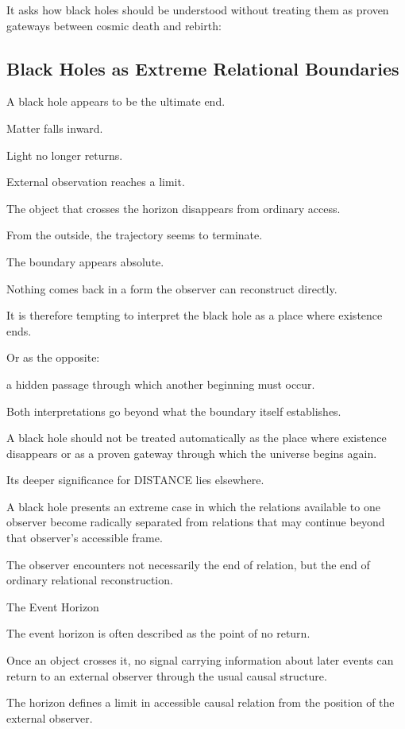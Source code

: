 It asks how black holes should be understood without treating them as proven gateways between cosmic death and rebirth:

\subsection*{\textbf{Black Holes as Extreme Relational Boundaries}} 

A black hole appears to be the ultimate end.

Matter falls inward.

Light no longer returns.

External observation reaches a limit.

The object that crosses the horizon disappears from ordinary access.

From the outside, the trajectory seems to terminate.

The boundary appears absolute.

Nothing comes back in a form the observer can reconstruct directly.

It is therefore tempting to interpret the black hole as a place where existence ends.

Or as the opposite:

a hidden passage through which another beginning must occur.

Both interpretations go beyond what the boundary itself establishes.

A black hole should not be treated automatically as the place where existence disappears or as a proven gateway through which the universe begins again.

Its deeper significance for DISTANCE lies elsewhere.

A black hole presents an extreme case in which the relations available to one observer become radically separated from relations that may continue beyond that observer’s accessible frame.

The observer encounters not necessarily the end of relation, but the end of ordinary relational reconstruction.

The Event Horizon

The event horizon is often described as the point of no return.

Once an object crosses it, no signal carrying information about later events can return to an external observer through the usual causal structure.

The horizon defines a limit in accessible causal relation from the position of the external observer.

